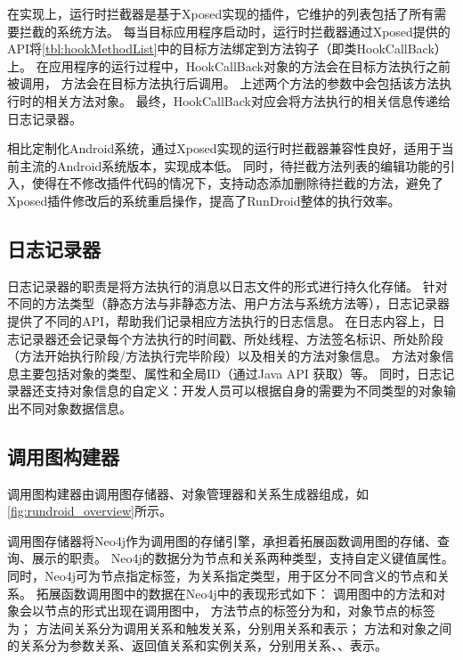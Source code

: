在实现上，运行时拦截器是基于Xposed\cite{Xposed}实现的插件，它维护的列表包括了所有需要拦截的系统方法。%
每当目标应用程序启动时，运行时拦截器通过Xposed提供的API将\autoref{tbl:hookMethodList}中的目标方法绑定到方法钩子（即类HookCallBack）上。
在应用程序的运行过程中，HookCallBack对象的方法会在目标方法执行之前被调用，
方法会在目标方法执行后调用。
上述两个方法的参数中会包括该方法执行时的相关方法对象。
最终，HookCallBack对应会将方法执行的相关信息传递给日志记录器。



相比定制化Android系统，通过Xposed实现的运行时拦截器兼容性良好，适用于当前主流的Android系统版本，实现成本低。
同时，待拦截方法列表的编辑功能的引入，使得在不修改插件代码的情况下，支持动态添加删除待拦截的方法，避免了Xposed插件修改后的系统重启操作，提高了RunDroid整体的执行效率。


\subsection{日志记录器}

日志记录器的职责是将方法执行的消息以日志文件的形式进行持久化存储。
针对不同的方法类型（静态方法与非静态方法、用户方法与系统方法等），日志记录器提供了不同的API，帮助我们记录相应方法执行的日志信息。
在日志内容上，日志记录器还会记录每个方法执行的时间戳、所处线程、方法签名标识、所处阶段（方法开始执行阶段/方法执行完毕阶段）以及相关的方法对象信息。
方法对象信息主要包括对象的类型、属性和全局ID（通过Java API  获取）等。
同时，日志记录器还支持对象信息的自定义：开发人员可以根据自身的需要为不同类型的对象输出不同对象数据信息。




\subsection{调用图构建器}

调用图构建器由调用图存储器、对象管理器和关系生成器组成，如\autoref{fig:rundroid_overview}所示。

调用图存储器将Neo4j\cite{Neo4jthe19}作为调用图的存储引擎，承担着拓展函数调用图的存储、查询、展示的职责。
Neo4j的数据分为节点和关系两种类型，支持自定义键值属性。
同时，Neo4j可为节点指定标签，为关系指定类型，用于区分不同含义的节点和关系。
拓展函数调用图中的数据在Neo4j中的表现形式如下：
调用图中的方法和对象会以节点的形式出现在调用图中， 方法节点的标签分为和，对象节点的标签为；
方法间关系分为调用关系和触发关系，分别用关系和表示；
方法和对象之间的关系分为参数关系、返回值关系和实例关系，分别用关系、、表示。




